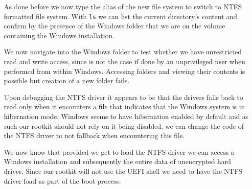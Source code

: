 As done before we now type the alias of the new file system to switch to NTFS formatted file system. With \lstinline{ls} we can list the current directory's content and confirm by the presence of the Windows folder that we are on the volume containing the Windows installation.


We now navigate into the Windows folder to test whether we have unrestricted read and write access, since is not the case if done by an unprivileged user when performed from within Windows. Accessing folders and viewing their contents is possible but creation of a new folder fails.

Upon debugging the \ac{NTFS} driver it appears to be that the drivers falls back to read only when it encounters a file that indicates that the Windows system is in hibernation mode. Windows seems to have hibernation enabled by default and as such our rootkit should not rely on it being disabled, we can change the code of the \ac{NTFS} driver to not fallback when encountering this file.

We now know that provided we get to load the \ac{NTFS} driver we can access a Windows installation and subsequently the entire data of unencrypted hard drives. Since our rootkit will not use the UEFI shell we need to have the NTFS driver load as part of the boot process.

